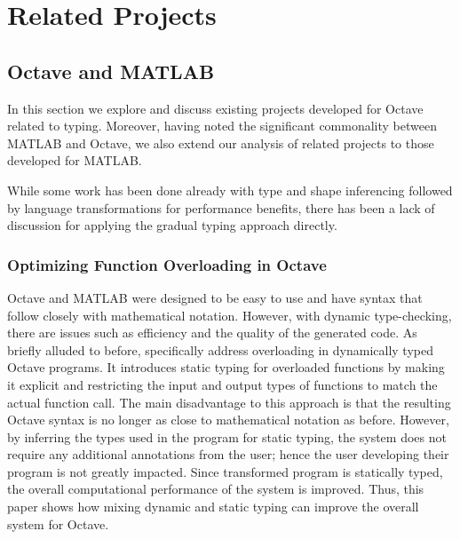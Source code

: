 \section{Related Projects}
\subsection{Octave and MATLAB}
 In this section we explore and discuss existing projects developed for Octave related to typing. Moreover, having noted the significant commonality between MATLAB and Octave, we also extend our analysis of related projects to those developed for MATLAB.
 
 While some work has been done already with type and shape inferencing followed by language transformations for performance benefits, there has been a lack of discussion for applying the gradual typing approach directly.

\subsubsection{Optimizing Function Overloading in Octave}
Octave and MATLAB were designed to be easy to use and have syntax that follow closely with mathematical notation. However, with dynamic type-checking, there are issues such as efficiency and the quality of the generated code. As briefly alluded to before, \citet{olmos2003turning} specifically address overloading in dynamically typed Octave programs. It introduces static typing for overloaded functions by making it explicit and restricting the input and output types of functions to match the actual function call. The main disadvantage to this approach is that the resulting Octave syntax is no longer as close to mathematical notation as before. However, by inferring the types used in the program for static typing, the system does not require any additional annotations from the user; hence the user developing their program is not greatly impacted. Since transformed program is statically typed, the overall computational performance of the system is improved. Thus, this paper shows how mixing dynamic and static typing can improve the overall system for Octave.

